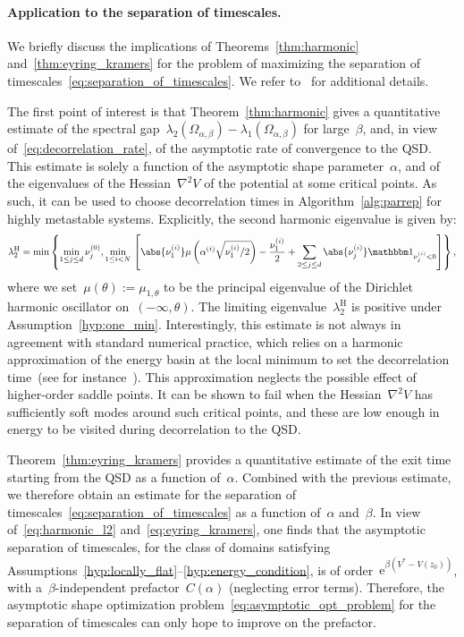 \documentclass[a4]{article}
\newcommand{\e}{\mathrm{e}}
\newcommand{\1}{\mathbbm 1}
\newcommand{\hessEigval}[2]{\nu^{(#1)}_{#2}} %
\newcommand{\Vstar}{V^*}
\begin{document}
    \paragraph{Application to the separation of timescales.}
    We briefly discuss the implications of Theorems~\ref{thm:harmonic} and~\ref{thm:eyring_kramers} for the problem of maximizing the separation of timescales~\eqref{eq:separation_of_timescales}. We refer to~\cite[Section 3.3]{BLS24} for additional details.

    The first point of interest is that Theorem~\ref{thm:harmonic} gives a quantitative estimate of the spectral gap~$\lambda_2(\Omega_{\alpha,\beta})-\lambda_1(\Omega_{\alpha,\beta})$ for large~$\beta$, and, in view of~\eqref{eq:decorrelation_rate}, of the asymptotic rate of convergence to the QSD.
    This estimate is solely a function of the asymptotic shape parameter~$\alpha$, and of the eigenvalues of the Hessian~$\nabla^2 V$ of the potential at some critical points.
    As such, it can be used to choose decorrelation times in Algorithm~\ref{alg:parrep} for highly metastable systems. Explicitly, the second harmonic eigenvalue is given by:
    \begin{equation}
        \label{eq:lambda_2}
        \lambda_2^{\mathrm{H}}=\min\left\{\underset{1\leq j\leq d}{\min}\,\hessEigval{0}{j},\underset{1\leq i<N}{\min}\,\left[\abs{\hessEigval{i}{1}}\mu\left(\alpha^{(i)}\sqrt{\hessEigval{i}{1}/2}\right)-\frac{\hessEigval{i}{1}}2 + \sum_{2\leq j\leq d}\abs{\hessEigval{i}{j}}\1_{\hessEigval{i}{j}<0}\right]\right\},
    \end{equation}
    where we set~$\mu(\theta):=\mu_{1,\theta}$ to be the principal eigenvalue of the Dirichlet harmonic oscillator on~$(-\infty,\theta)$. The limiting eigenvalue~$\lambda_2^{\mathrm{H}}$ is positive under Assumption~\ref{hyp:one_min}.
    Interestingly, this estimate is not always in agreement with standard numerical practice, which relies on a harmonic approximation of the energy basin at the local minimum to set the decorrelation time~(see for instance~\cite{PUV15}). This approximation neglects the possible effect of higher-order saddle points. It can be shown to fail when the Hessian~$\nabla^2 V$ has sufficiently soft modes around such critical points, and these are low enough in energy to be visited during decorrelation to the QSD.

    Theorem~\ref{thm:eyring_kramers} provides a quantitative estimate of the exit time starting from the QSD as a function of~$\alpha$. Combined with the previous estimate, we therefore obtain an estimate for the separation of timescales~\eqref{eq:separation_of_timescales} as a function of~$\alpha$ and~$\beta$. In view of~\eqref{eq:harmonic_l2} and~\eqref{eq:eyring_kramers}, one finds that the asymptotic separation of timescales, for the class of domains satisfying Assumptions~\ref{hyp:locally_flat}--\ref{hyp:energy_condition}, is of order~$\e^{\beta(\Vstar-V(z_0))}$, with a~$\beta$-independent prefactor~$C(\alpha)$ (neglecting error terms).
    Therefore, the asymptotic shape optimization problem~\eqref{eq:asymptotic_opt_problem} for the separation of timescales can only hope to improve on the prefactor.
    
\end{document}
